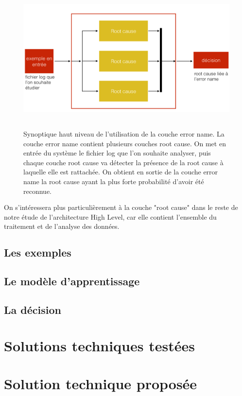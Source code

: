 \begin{figure}[h]
	\centering\includegraphics[height=7.5cm]{images/synoptique_error.png}
	\caption[Utilisation de la couche error name]{Synoptique haut niveau de l'utilisation de la couche error name. La couche error name contient plusieurs couches root cause. On met en entrée du système le fichier log que l'on souhaite analyser, puis chaque couche root cause va détecter la présence de la root cause à laquelle elle est rattachée. On obtient en sortie de la couche error name la root cause  ayant la plus forte probabilité d'avoir été reconnue.}
	\label{fig:utilisation de la couche error name}
\end{figure}

On s'intéressera plus particulièrement à la couche "root cause" dans le reste de notre étude de l'architecture High Level, car elle contient l'ensemble du traitement et de l'analyse des données.

\subsection{Les exemples}
\label{Automatisation du processus d'investigation: Achitecture High Level du système proposé: Les exemples}

\subsection{Le modèle d'apprentissage}
\label{Automatisation du processus d'investigation: Achitecture High Level du système proposé: Le modèle d'apprentissage}

\subsection{La décision}
\label{Automatisation du processus d'investigation: Achitecture High Level du système proposé: La décision}



\section{Solutions techniques testées}
\label{Automatisation du processus d'investigation: Solutions techniques testées}




\section{Solution technique proposée}
\label{Automatisation du processus d'investigation: Solution technique proposée}

